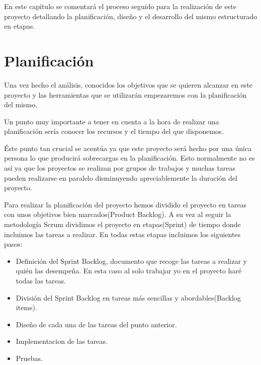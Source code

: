 

 En este capítulo se comentará el proceso seguido para la realización de este proyecto detallando la planificación, diseño y el desarrollo del mismo estructurado en etapas.
 
\section{Planificación}

Una vez hecho el análisis, conocidos los objetivos que se quieren alcanzar en este proyecto y las herramientas que se utilizarán  empezaremos con la planificación del mismo.

Un punto muy  importante a tener en cuenta a la hora de realizar una planificación sería conocer los recursos y el tiempo del que disponemos.




Éste punto tan crucial se acentúa ya que este proyecto será hecho por una única persona lo que producirá sobrecargas en la planificación. Esto normalmente no es así ya que los proyectos se realizan por grupos de trabajos y muchas tareas pueden realizarse en paralelo disminuyendo apreciablemente la duración del proyecto.

Para realizar la planificación del proyecto hemos dividido el proyecto en tareas con unos objetivos bien marcados(Product Backlog). A su vez al seguir la metodología Scrum dividimos el proyecto en etapas(Sprint) de tiempo donde incluimos las tareas a realizar.
En todas estas etapas incluimos los siguientes pasos:
 
 


\begin{itemize}
\item Definición del Sprint Backlog, documento que recoge las tareas a realizar y quién las desempeña. En esta caso al solo trabajar yo en el proyecto haré todas las tareas.


\item División del Sprint Backlog en tareas más sencillas y abordables(Backlog items). 



\item Diseño de cada una de las tareas del punto anterior.
\item  Implementacion de las tareas.
\item Pruebas.
\end{itemize}


